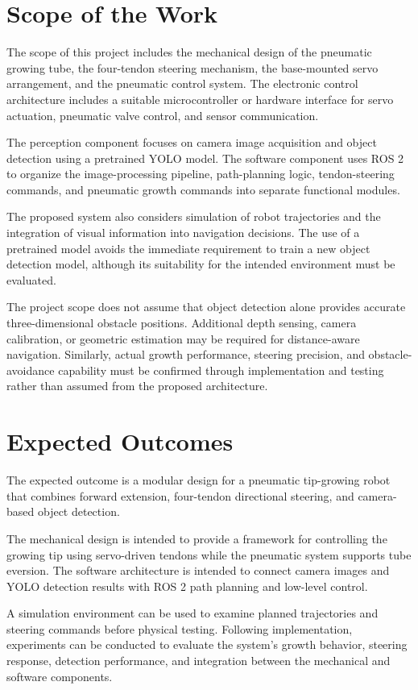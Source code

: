 \section{Scope of the Work}

The scope of this project includes the mechanical design of the pneumatic growing tube, the four-tendon steering mechanism, the base-mounted servo arrangement, and the pneumatic control system. The electronic control architecture includes a suitable microcontroller or hardware interface for servo actuation, pneumatic valve control, and sensor communication.

The perception component focuses on camera image acquisition and object detection using a pretrained YOLO model. The software component uses ROS 2 to organize the image-processing pipeline, path-planning logic, tendon-steering commands, and pneumatic growth commands into separate functional modules.

The proposed system also considers simulation of robot trajectories and the integration of visual information into navigation decisions. The use of a pretrained model avoids the immediate requirement to train a new object detection model, although its suitability for the intended environment must be evaluated.

The project scope does not assume that object detection alone provides accurate three-dimensional obstacle positions. Additional depth sensing, camera calibration, or geometric estimation may be required for distance-aware navigation. Similarly, actual growth performance, steering precision, and obstacle-avoidance capability must be confirmed through implementation and testing rather than assumed from the proposed architecture.

\section{Expected Outcomes}

The expected outcome is a modular design for a pneumatic tip-growing robot that combines forward extension, four-tendon directional steering, and camera-based object detection.

The mechanical design is intended to provide a framework for controlling the growing tip using servo-driven tendons while the pneumatic system supports tube eversion. The software architecture is intended to connect camera images and YOLO detection results with ROS 2 path planning and low-level control.

A simulation environment can be used to examine planned trajectories and steering commands before physical testing. Following implementation, experiments can be conducted to evaluate the system's growth behavior, steering response, detection performance, and integration between the mechanical and software components.

